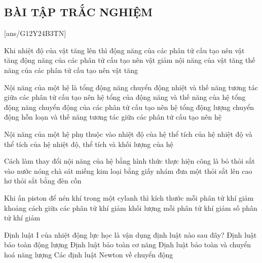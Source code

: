 	\subsection{BÀI TẬP TRẮC NGHIỆM}
	[ans/G12Y24B3TN]
	\begin{ex}
		Khi nhiệt độ của vật tăng lên thì
		\choice
		{\True động năng của các phân tử cấu tạo nên vật tăng}
		{động năng của các phân tử cấu tạo nên vật giảm}
		{nội năng của vật tăng}
		{thế năng của các phân tử cấu tạo nên vật tăng}
		\loigiai{ }
		\end{ex}
	\begin{ex}
Nội năng của một hệ là 
	\choice
	{\True tổng động năng chuyển động nhiệt và thế năng tương tác giữa các phân tử cấu tạo nên hệ}
	{tổng của động năng và thế năng của hệ}
	{tổng động năng chuyển động của các phân tử cấu tạo nên hệ}
	{tổng động lượng chuyển động hỗn loạn và thế năng tương tác giữa các phân tử cấu tạo nên hệ}
	\loigiai{ }
\end{ex}
	\begin{ex}
	Nội năng của một hệ phụ thuộc vào
	\choice
	{nhiệt độ của hệ}
	{thể tích của hệ}
	{\True nhiệt độ và thể tích của hệ}
	{nhiệt độ, thể tích và khối lượng của hệ}
	\loigiai{ }
\end{ex}
	\begin{ex}
Cách làm thay đổi nội năng của hệ bằng hình thức thực hiện công là
	\choice
	{bỏ thỏi sắt vào nước nóng}
	{\True chà sát miếng kim loại bằng giấy nhám}
	{đưa một thỏi sắt lên cao}
	{hơ thỏi sắt bằng đèn cồn}
	\loigiai{ }
\end{ex}
	\begin{ex}
Khi ấn piston để nén khí trong một cylanh thì
	\choice
	{kích thước mỗi phân tử khí giảm}
	{\True khoảng cách giữa các phân tử khí giảm}
	{khối lượng mỗi phân tử khí giảm}
	{số phân tử khí giảm}
	\loigiai{ }
\end{ex}
	\begin{ex}
	Định luật I của nhiệt động lực học là vận dụng định luật nào sau đây?
	\choice
	{Định luật bảo toàn động lượng}
	{Định luật bảo toàn cơ năng}
	{\True Định luật bảo toàn và chuyển hoá năng lượng}
	{Các định luật Newton về chuyển động}
	\loigiai{ }
\end{ex}
